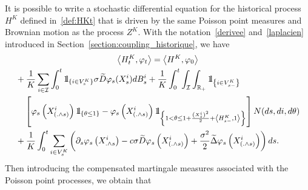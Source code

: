 \documentclass[AHL,Unicode,longabstracts,published]{cedram}
\newcommand{\Io}{\mathcal{I}}
\newcommand*\R{\mathbb{R}}
\newcommand*\ind{{\mathchoice {\rm 1\mskip-4mu l} {\rm 1\mskip-4mu l} {\rm 1\mskip-4.5mu l} {\rm 1\mskip-5mu l}}}
\begin{document}
\noindent It is possible to write a stochastic differential equation for the historical process $H^K$ defined in~\eqref{def:HKt} that is driven by the same Poisson point measures and Brownian motion as the process $Z^K$. With the notation~\eqref{derivee} and~\eqref{laplacien} introduced in Section~\ref{section:coupling_historique}, we have
\begingroup
\allowdisplaybreaks
\begin{multline}\label{eq:sde}
\left\langle H^{K}_t,\varphi_t\right\rangle = \left\langle H^{K}, \varphi_0\right\rangle\\
\begin{aligned} 
&+ \frac{1}{K}\sum_{i \in \Io}\int_0^t \ind_{\{i\in V^K_s\}} \sigma {\widetilde{D}}\varphi_s(X^i_s) dB^i_s
+\frac{1}{K}\int_0^t \int_{\Io}\int_{\R_+}\ind_{\left\{i \in V^K_{s-}\right\}}\\
&\quad \left[\varphi_{s}\left(X^i_{\left(.\wedge s\right)}\right)\ind_{\left\{\theta \leq 1\right\}} -\varphi_{s}\left(X^i_{\left(.\wedge s\right)}\right) \ind_{\left\{1 < \theta \leq 1 + \frac{\left(X^i_{s}\right)^2}{2}+\left\langle H_{s-}^{K},1\right\rangle\right\}} \right] N(ds, di, d\theta) \\
& +\frac{1}{K} \int_0^t \sum_{i \in V^K_s}\left(\partial_s \varphi_s\left(X^i_{.\wedge s}\right) -c\sigma {\widetilde{D}} \varphi_s\left(X^i_{\left(.\wedge s\right)}\right)+\frac{\sigma^2}{2} {\widetilde{\Delta}}\varphi_s\left(X^i_{\left(.\wedge s\right)}\right) \right) ds.
\end{aligned}
\end{multline}
\endgroup
Then introducing the compensated martingale measures associated with the Poisson point processes, we obtain that
\vspace*{60pt}
\pagebreak
\end{document}
